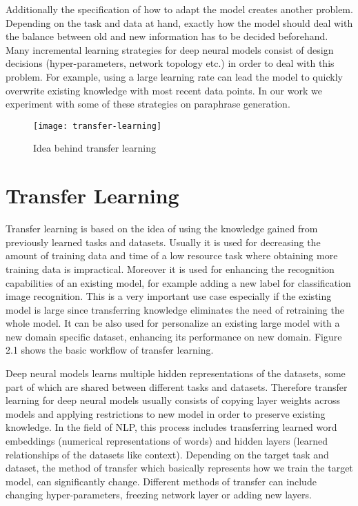 Additionally the specification of how to adapt the model creates another problem. Depending on the task and data at hand, exactly how the model should deal with the balance between old and new information has to be decided beforehand. Many incremental learning strategies for deep neural models consist of design decisions (hyper-parameters, network topology etc.) in order to deal with this problem. For example, using a large learning rate can lead the model to quickly overwrite existing knowledge with most recent data points. In our work we experiment with some of these strategies on paraphrase generation.

\begin{figure}[t]
\texttt{[image: transfer-learning]}
\centering
\caption{Idea behind transfer learning}
\end{figure}

\section{Transfer Learning}

Transfer learning is based on the idea of using the knowledge gained from previously learned tasks and datasets. Usually it is used for decreasing the amount of training data and time of a low resource task where obtaining more training data is impractical. Moreover it is used for enhancing the recognition capabilities of an existing model, for example adding a new label for classification image recognition. This is a very important use case especially if the existing model is large since transferring knowledge eliminates the need of retraining the whole model. It can be also used for personalize an existing large model with a new domain specific dataset, enhancing its performance on new domain. Figure 2.1 shows the basic workflow of transfer learning.

Deep neural models learns multiple hidden representations of the datasets, some part of which are shared between different tasks and datasets. Therefore transfer learning for deep neural models usually consists of copying layer weights across models and applying restrictions to new model in order to preserve existing knowledge. In the field of NLP, this process includes transferring learned word embeddings (numerical representations of words) and hidden layers (learned relationships of the datasets like context). Depending on the target task and dataset, the method of transfer which basically represents how we train the target model, can significantly change. Different methods of transfer can include changing hyper-parameters, freezing network layer or adding new layers.

